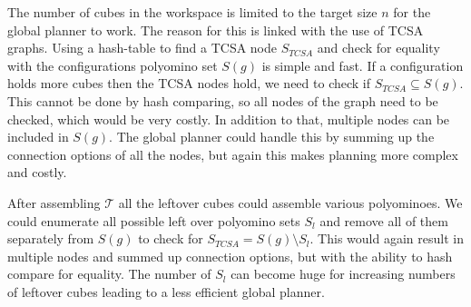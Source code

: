 The number of cubes in the workspace is limited to the target size $n$ for the global planner to work.
The reason for this is linked with the use of TCSA graphs. 
Using a hash-table to find a TCSA node $S_\textit{TCSA}$ and check for equality with the configurations polyomino set $S(g)$ is simple and fast.
If a configuration holds more cubes then the TCSA nodes hold, we need to check if $S_\textit{TCSA} \subseteq S(g)$.
This cannot be done by hash comparing, so all nodes of the graph need to be checked, which would be very costly.
In addition to that, multiple nodes can be included in $S(g)$.
The global planner could handle this by summing up the connection options of all the nodes, but again this makes planning more complex and costly.

After assembling $\mathcal{T}$ all the leftover cubes could assemble various polyominoes.
We could enumerate all possible left over polyomino sets $S_l$ and remove all of them separately from $S(g)$ to check for $S_\textit{TCSA} = S(g) \setminus S_l$.
This would again result in multiple nodes and summed up connection options, but with the ability to hash compare for equality.
The number of $S_l$ can become huge for increasing numbers of leftover cubes leading to a less efficient global planner.




